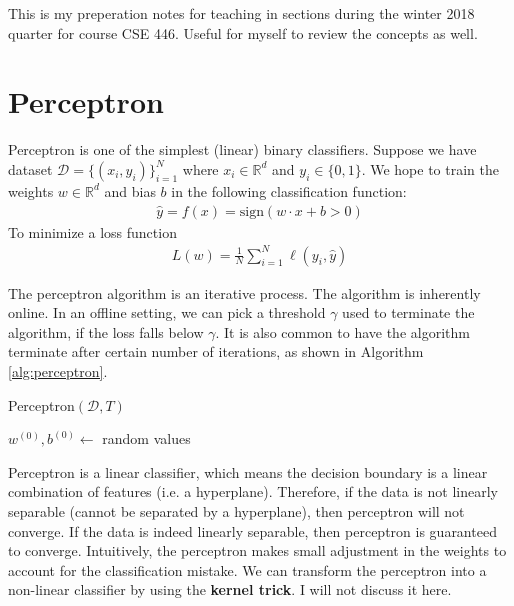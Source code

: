 \documentclass[12pt]{article}
\title{}
\begin{document}
\pagestyle{fancy}
\fancyhf{} %
\cfoot{\thepage}
\renewcommand{\headrulewidth}{1pt}

This is my preperation notes for teaching in sections during the winter 2018 quarter for course CSE 446. Useful for myself to review the concepts as well.

\section{Perceptron}

Perceptron is one of the simplest (linear) binary classifiers. Suppose we have dataset $\mathcal{D}=\{(x_i, y_i)\}_{i=1}^N$ where $x_i\in\mathbb{R}^d$ and $y_i\in\{0,1\}$. We hope to train the weights $w\in\mathbb{R}^d$ and bias $b$ in the following classification function:
\begin{align}
\hat{y}=f(x)=\text{sign}(w\cdot x+b>0)
\end{align}
To minimize a loss function
\begin{align}
  L(w) = \frac{1}{N}\sum_{i=1}^N\ell(y_i, \hat{y})
\end{align}

The perceptron algorithm is an iterative process. The algorithm is inherently online. In an offline setting, we can pick a threshold $\gamma$ used to terminate the algorithm, if the loss falls below $\gamma$. It is also common to have the algorithm terminate after certain number of iterations, as shown in Algorithm \ref{alg:perceptron}.


\begin{algorithm}[h]
    \caption{Perceptron$(\mathcal{D},T)$}
    \label{alg:perceptron}

    $w^{(0)}, b^{(0)}\gets$ random values\;
\end{algorithm}

Perceptron is a linear classifier, which means the decision boundary is a linear combination of features (i.e. a hyperplane). Therefore, if the data is not linearly separable (cannot be separated by a hyperplane), then perceptron will not converge. If the data is indeed linearly separable, then perceptron is guaranteed to converge. Intuitively, the perceptron makes small adjustment in the weights to account for the classification mistake. We can transform the perceptron into a non-linear classifier by using the \textbf{kernel trick}. I will not discuss it here.
\end{document}
